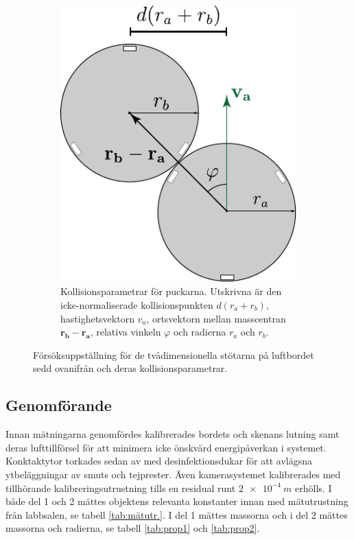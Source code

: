 \begin{figure}[H]
\begin{subfigure}{.45\textwidth}
        \includegraphics[width=0.75\linewidth]{images/metod/del2_kollision.pdf}
        \caption{Kollisionsparametrar för puckarna. Utskrivna är den icke-normaliserade kollisionspunkten $d(r_a+r_b)$, hastighetsvektorn $v_a$, ortsvektorn mellan masscentran $\mathbf{r_b}-\mathbf{r_a}$, relativa vinkeln $\varphi$ och radierna $r_a$ och $r_b$.}
        \label{fig:del2_collision}
    \end{subfigure}
    \caption{Försöksuppställning för de tvådimensionella stötarna på luftbordet sedd ovanifrån och deras kollisionsparametrar.}
    \label{fig:del2}
\end{figure}

\subsection{Genomförande} \label{chap:material}
Innan mätningarna genomfördes kalibrerades bordets och skenans lutning samt deras lufttillförsel för att minimera icke önskvärd energipåverkan i systemet. Konktaktytor torkades sedan av med desinfektionsdukar för att avlägsna ytbeläggningar av smuts och tejprester. Även kamerasystemet kalibrerades med tillhörande kalibreringsutrustning tills en residual runt $\SI{2e-4}{m}$ erhölls. I både del 1 och 2 mättes objektens relevanta konstanter innan med mätutrustning från labbsalen, se tabell \ref{tab:mätutr.}. I del 1 mättes massorna och i del 2 mättes massorna och radierna, se tabell \ref{tab:prop1} och \ref{tab:prop2}.

